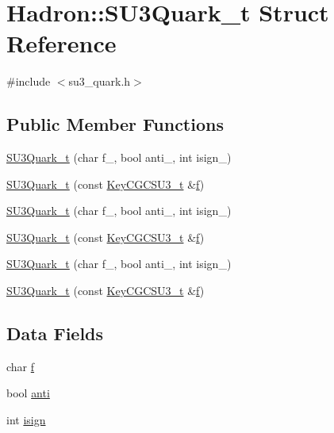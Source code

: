 \hypertarget{structHadron_1_1SU3Quark__t}{}\section{Hadron\+:\+:S\+U3\+Quark\+\_\+t Struct Reference}
\label{structHadron_1_1SU3Quark__t}


{\ttfamily \#include $<$su3\+\_\+quark.\+h$>$}

\subsection*{Public Member Functions}
\begin{DoxyCompactItemize}
\item 
\mbox{\hyperlink{structHadron_1_1SU3Quark__t_a57662fb1a4488e8144f8646e9cc13c2e}{S\+U3\+Quark\+\_\+t}} (char f\+\_\+, bool anti\+\_\+, int isign\+\_\+)
\item 
\mbox{\hyperlink{structHadron_1_1SU3Quark__t_a7d4c72a59b297140813815d95d426e42}{S\+U3\+Quark\+\_\+t}} (const \mbox{\hyperlink{structHadron_1_1KeyCGCSU3__t}{Key\+C\+G\+C\+S\+U3\+\_\+t}} \&\mbox{\hyperlink{structHadron_1_1SU3Quark__t_a3607400b071fe522d2f3e62048affe73}{f}})
\item 
\mbox{\hyperlink{structHadron_1_1SU3Quark__t_a57662fb1a4488e8144f8646e9cc13c2e}{S\+U3\+Quark\+\_\+t}} (char f\+\_\+, bool anti\+\_\+, int isign\+\_\+)
\item 
\mbox{\hyperlink{structHadron_1_1SU3Quark__t_a7d4c72a59b297140813815d95d426e42}{S\+U3\+Quark\+\_\+t}} (const \mbox{\hyperlink{structHadron_1_1KeyCGCSU3__t}{Key\+C\+G\+C\+S\+U3\+\_\+t}} \&\mbox{\hyperlink{structHadron_1_1SU3Quark__t_a3607400b071fe522d2f3e62048affe73}{f}})
\item 
\mbox{\hyperlink{structHadron_1_1SU3Quark__t_a57662fb1a4488e8144f8646e9cc13c2e}{S\+U3\+Quark\+\_\+t}} (char f\+\_\+, bool anti\+\_\+, int isign\+\_\+)
\item 
\mbox{\hyperlink{structHadron_1_1SU3Quark__t_a7d4c72a59b297140813815d95d426e42}{S\+U3\+Quark\+\_\+t}} (const \mbox{\hyperlink{structHadron_1_1KeyCGCSU3__t}{Key\+C\+G\+C\+S\+U3\+\_\+t}} \&\mbox{\hyperlink{structHadron_1_1SU3Quark__t_a3607400b071fe522d2f3e62048affe73}{f}})
\end{DoxyCompactItemize}
\subsection*{Data Fields}
\begin{DoxyCompactItemize}
\item 
char \mbox{\hyperlink{structHadron_1_1SU3Quark__t_a3607400b071fe522d2f3e62048affe73}{f}}
\item 
bool \mbox{\hyperlink{structHadron_1_1SU3Quark__t_a71ef8ea48f01852689482b6e9c5dda0e}{anti}}
\item 
int \mbox{\hyperlink{structHadron_1_1SU3Quark__t_a1ab0d1ef0eb3573f07a0f96012b68fa8}{isign}}
\end{DoxyCompactItemize}


